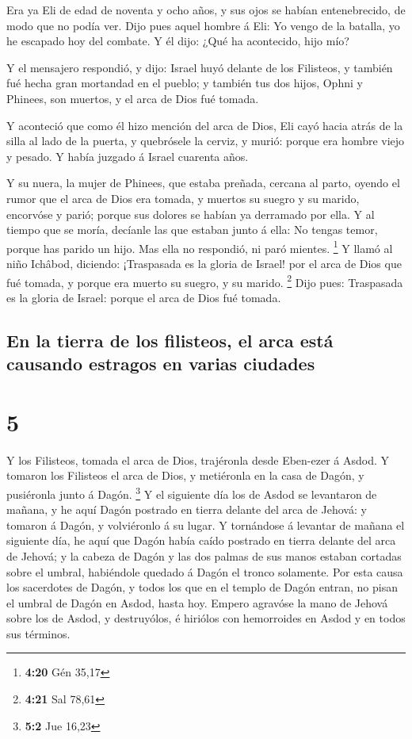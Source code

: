  Era ya Eli de edad de noventa y ocho años, y sus ojos se
habían entenebrecido, de modo que no podía ver.  Dijo pues
aquel hombre á Eli: Yo vengo de la batalla, yo he escapado hoy del
combate. Y él dijo: ¿Qué ha acontecido, hijo mío?

 Y el mensajero respondió, y dijo: Israel huyó delante de
los Filisteos, y también fué hecha gran mortandad en el pueblo; y
también tus dos hijos, Ophni y Phinees, son muertos, y el arca de Dios
fué tomada.

 Y aconteció que como él hizo mención del arca de Dios, Eli
cayó hacia atrás de la silla al lado de la puerta, y quebrósele la
cerviz, y murió: porque era hombre viejo y pesado. Y había juzgado á
Israel cuarenta años.

 Y su nuera, la mujer de Phinees, que estaba preñada,
cercana al parto, oyendo el rumor que el arca de Dios era tomada, y
muertos su suegro y su marido, encorvóse y parió; porque sus dolores se
habían ya derramado por ella.  Y al tiempo que se moría,
decíanle las que estaban junto á ella: No tengas temor, porque has
parido un hijo. Mas ella no respondió, ni paró mientes. \footnote{\textbf{4:20}
  Gén 35,17}  Y llamó al niño Ichâbod, diciendo:
¡Traspasada es la gloria de Israel! por el arca de Dios que fué tomada,
y porque era muerto su suegro, y su marido. \footnote{\textbf{4:21} Sal
  78,61}  Dijo pues: Traspasada es la gloria de Israel:
porque el arca de Dios fué tomada.

\hypertarget{en-la-tierra-de-los-filisteos-el-arca-estuxe1-causando-estragos-en-varias-ciudades}{%
\subsection{En la tierra de los filisteos, el arca está causando
estragos en varias
ciudades}\label{en-la-tierra-de-los-filisteos-el-arca-estuxe1-causando-estragos-en-varias-ciudades}}

\hypertarget{section-4}{%
\section{5}\label{section-4}}

 Y los Filisteos, tomada el arca de Dios, trajéronla desde
Eben-ezer á Asdod.  Y tomaron los Filisteos el arca de Dios,
y metiéronla en la casa de Dagón, y pusiéronla junto á Dagón.
\footnote{\textbf{5:2} Jue 16,23}  Y el siguiente día los de
Asdod se levantaron de mañana, y he aquí Dagón postrado en tierra
delante del arca de Jehová: y tomaron á Dagón, y volviéronlo á su lugar.
 Y tornándose á levantar de mañana el siguiente día, he aquí
que Dagón había caído postrado en tierra delante del arca de Jehová; y
la cabeza de Dagón y las dos palmas de sus manos estaban cortadas sobre
el umbral, habiéndole quedado á Dagón el tronco solamente. 
Por esta causa los sacerdotes de Dagón, y todos los que en el templo de
Dagón entran, no pisan el umbral de Dagón en Asdod, hasta hoy.
 Empero agravóse la mano de Jehová sobre los de Asdod, y
destruyólos, é hiriólos con hemorroides en Asdod y en todos sus
términos.

